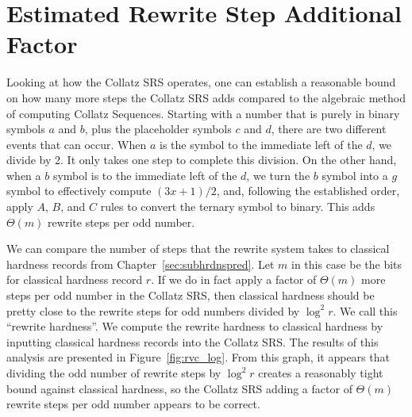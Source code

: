 \section{Estimated Rewrite Step Additional Factor} \label{subsec:estrwsteps}
Looking at how the Collatz SRS operates, one can establish a reasonable bound on how many more steps the Collatz SRS adds compared to the algebraic method of computing Collatz Sequences. Starting with a number that is purely in binary symbols $a$ and $b$, plus the placeholder symbols $c$ and $d$, there are two different events that can occur. When $a$ is the symbol to the immediate left of the $d$, we divide by 2. It only takes one step to complete this division. On the other hand, when a $b$ symbol is to the immediate left of the $d$, we turn the $b$ symbol into a $g$ symbol to effectively compute $(3x+1)/2$, and, following the established order, apply $A$, $B$, and $C$ rules to convert the ternary symbol to binary. This adds $\Theta(m)$ rewrite steps per odd number. \par
We can compare the number of steps that the rewrite system takes to classical hardness records from Chapter~\ref{sec:subhrdnspred}. Let $m$ in this case be the bits for classical hardness record $r$. If we do in fact apply a factor of $\Theta(m)$ more steps per odd number in the Collatz SRS, then classical hardness should be pretty close to the rewrite steps for odd numbers divided by $\log^2{r}$. We call this ``rewrite hardness''. We compute the rewrite hardness to classical hardness by inputting classical hardness records into the Collatz SRS. The results of this analysis are presented in Figure~\ref{fig:rvc_log}. From this graph, it appears that dividing the odd number of rewrite steps by $\log^2{r}$ creates a reasonably tight bound against classical hardness, so the Collatz SRS adding a factor of $\Theta(m)$ rewrite steps per odd number appears to be correct.
